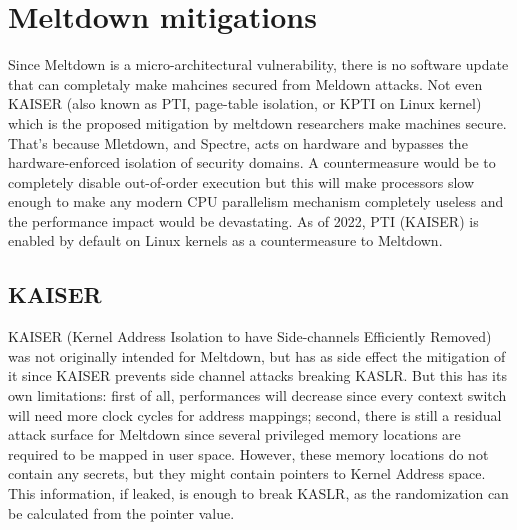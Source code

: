 \section{Meltdown mitigations}
Since Meltdown is a micro-architectural vulnerability, there is no software update that can completaly make mahcines secured from Meldown attacks.
Not even KAISER (also known as PTI, page-table isolation, or KPTI on Linux kernel) which is the proposed
mitigation by meltdown researchers make machines secure. That's because
Mletdown, and Spectre, acts on hardware and bypasses the hardware-enforced isolation of security domains.
A countermeasure would be to completely disable out-of-order execution but this will make processors slow enough to make any modern CPU parallelism mechanism
completely useless and the performance impact would be devastating. As of 2022, PTI (KAISER) is enabled by default on Linux kernels as a countermeasure to Meltdown.
\subsection{KAISER}
KAISER (Kernel Address Isolation to have Side-channels Efficiently Removed) was not originally intended for Meltdown, but has as side effect the mitigation of it
since KAISER prevents side channel attacks breaking KASLR. But this has its own limitations: first of all, performances will decrease since every context switch will
need more clock cycles for address mappings; second, there is still a residual attack surface for Meltdown since several privileged memory locations are required
to be mapped in user space. However, these memory locations do not contain any secrets, but they might contain pointers to Kernel Address space. This information, if leaked,
is enough to break KASLR, as the randomization can be calculated from the pointer value.
